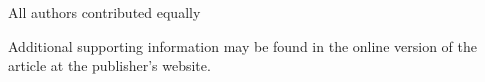 \documentclass[APA,Times1COL]{WileyNJDv5} %
\begin{document}
{}

All authors contributed equally










Additional supporting information may be found in the
online version of the article at the publisher’s website.










\nocite{*}%
\end{document}
